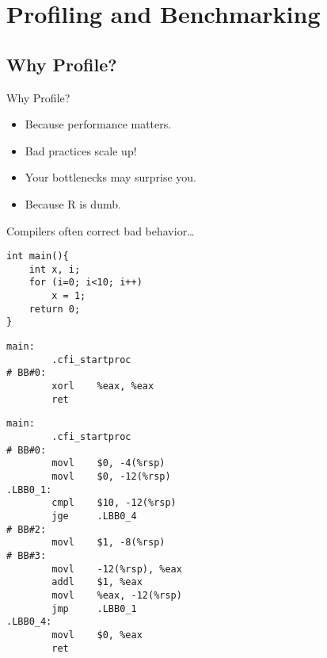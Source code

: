 \section{Profiling and Benchmarking}
\makesubcontentsslides


\subsection{Why Profile?}
\makesubcontentsslidessec

\begin{frame}
  \begin{block}{Why Profile?}
  \begin{itemize}
    \item Because performance matters.
    \item Bad practices scale up!
    \item Your bottlenecks may surprise you.
    \item Because R is dumb.
  \end{itemize}
  \end{block}
\end{frame}


\begin{frame}[fragile]{Compilers often correct bad behavior\dots}
  \begin{center}
\begin{minipage}{.4\textwidth}
\vspace{0pt}
\begin{lstlisting}[title=A Really Dumb Loop,language=Rcpp]
int main(){
    int x, i;
    for (i=0; i<10; i++)
        x = 1;
    return 0;
}
\end{lstlisting}
\begin{lstlisting}[language=shl,title=clang -O3 example.c]
main:
        .cfi_startproc
# BB#0:
        xorl    %eax, %eax
        ret
\end{lstlisting}
\end{minipage}
\begin{minipage}{.57\textwidth}
\begin{lstlisting}[language=shl,title=clang example.c]
main:
        .cfi_startproc
# BB#0:
        movl    $0, -4(%rsp)
        movl    $0, -12(%rsp)
.LBB0_1:
        cmpl    $10, -12(%rsp)
        jge     .LBB0_4
# BB#2:
        movl    $1, -8(%rsp)
# BB#3:
        movl    -12(%rsp), %eax
        addl    $1, %eax
        movl    %eax, -12(%rsp)
        jmp     .LBB0_1
.LBB0_4:
        movl    $0, %eax
        ret
\end{lstlisting}
\end{minipage}

  \end{center}
\end{frame}



